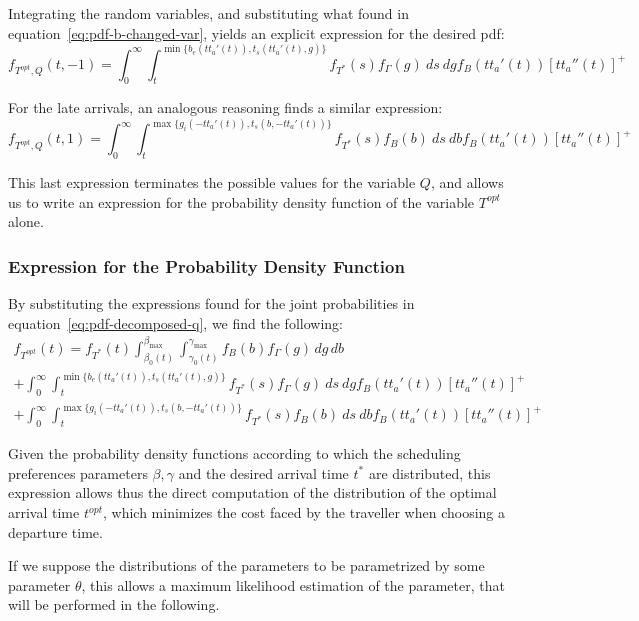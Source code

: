 Integrating the random variables,
and substituting what found in equation~\eqref{eq:pdf-b-changed-var},
yields an explicit expression for the desired pdf:
\begin{equation}
  \label{eq:early-final}
  f_{T^{opt}, Q}(t, -1) = \int_0^\infty \int_t^{\min\{b_e(tt_a'(t)), t_s(tt_a'(t), g)\}}f_{T^*}(s) f_\Gamma(g)\ ds\ dg f_B(tt_a'(t)) [tt_a''(t)]^+
\end{equation}

For the late arrivals, an analogous reasoning finds a similar expression:
\begin{equation}
  \label{eq:late-final}
  f_{T^{opt}, Q}(t, 1) = \int_0^\infty \int_t^{\max\{g_i(-tt_a'(t)), t_s(b, -tt_a'(t))\}}f_{T^*}(s) f_B(b)\ ds\ db f_B(tt_a'(t)) [tt_a''(t)]^+
\end{equation}

This last expression terminates the possible values for the variable \(Q\),
and allows us to write an expression for the probability density function of the variable \(T^{opt}\) alone.

\subsubsection{Expression for the Probability Density Function}

By substituting the expressions found for the joint probabilities in equation~\eqref{eq:pdf-decomposed-q},
we find the following:
\begin{multline}
  \label{eq:pdf-final}
    f_{T^{opt}}(t) = f_{T^*}(t)\int_{\beta_0(t)}^{\beta_{\text{max}}}\int_{\gamma_0(t)}^{\gamma_{\text{max}}}f_B(b)f_\Gamma(g)\, dg\, db \\
    + \int_0^\infty \int_t^{\min\{b_e(tt_a'(t)), t_s(tt_a'(t), g)\}}f_{T^*}(s) f_\Gamma(g)\ ds\ dg f_B(tt_a'(t)) [tt_a''(t)]^+ \\
    + \int_0^\infty \int_t^{\max\{g_i(-tt_a'(t)), t_s(b, -tt_a'(t))\}}f_{T^*}(s) f_B(b)\ ds\ db f_B(tt_a'(t)) [tt_a''(t)]^+
\end{multline}

Given the probability density functions according to which the scheduling preferences parameters \(\beta, \gamma\) and the desired arrival time \(t^*\) are distributed,
this expression allows thus the direct computation of the distribution of the optimal arrival time \(t^{opt}\),
which minimizes the cost faced by the traveller when choosing a departure time.

If we suppose the distributions of the parameters to be parametrized by some parameter \(\theta\),
this allows a maximum likelihood estimation of the parameter,
that will be performed in the following.

